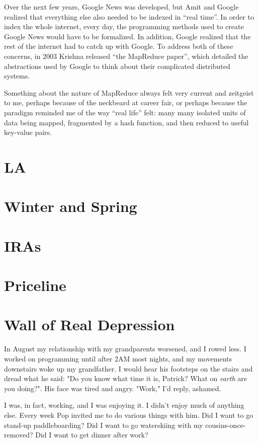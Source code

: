 \documentclass[12pt]{article}
\begin{document}
Over the next few years, Google News was developed, but Amit and Google realized
that everything else also needed to be indexed in ``real time''.  In order to
index the whole internet, every day, the programming methods used to create
Google News would have to be formalized.  In addition, Google realized that the
rest of the internet had to catch up with Google.  To address both of these
concerns, in 2003 Krishna released ``the MapReduce paper'', which detailed the
abstractions used by Google to think about their complicated distributed
systems.  

Something about the nature of MapReduce always felt very current and zeitgeist
to me, perhaps because of the neckbeard at career fair, or perhaps because the
paradigm reminded me of the way ``real life'' felt: many many isolated units of
data being mapped, fragmented by a hash function, and then reduced to useful
key-value pairs.


\section{LA}


\section{Winter and Spring}


\section{IRAs}


\section{Priceline}


\section{Wall of Real Depression}
In August my relationship with my grandparents worsened, and I rowed less.  I
worked on programming until after 2AM most nights, and my movements downstairs
woke up my grandfather.  I would hear his footsteps on the stairs and dread what
he said: "Do you know what time it is, Patrick?  What on \textit{earth} are you
doing?".  His face was tired and angry. "Work," I'd reply, ashamed.

I was, in fact, working, and I was enjoying it.  I didn't enjoy much of anything
else.  Every week Pop invited me to do various things with him.  Did I want to
go stand-up paddleboarding?  Did I want to go waterskiing with my cousins-once-
removed?  Did I want to get dinner after work?  
\end{document}
